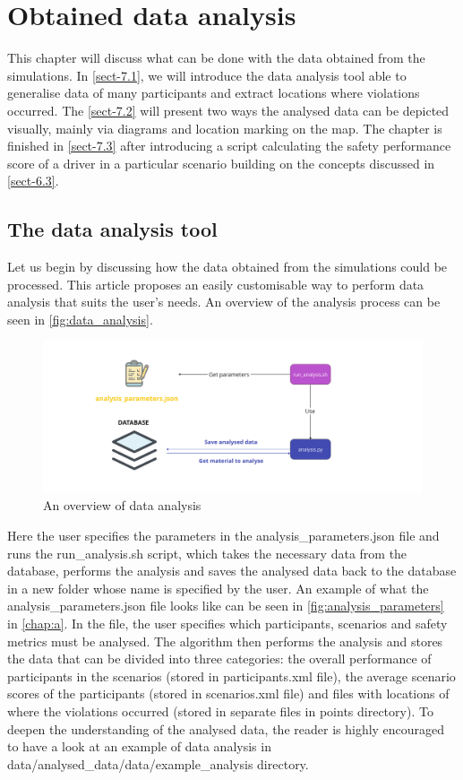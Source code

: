 \chapter{Obtained data analysis} \label{chap:seven}
This chapter will discuss what can be done with the data obtained from the simulations. In \autoref{sect-7.1}, we will introduce the data analysis tool able to generalise data of many participants and extract locations where violations occurred. The \autoref{sect-7.2} will present two ways the analysed data can be depicted visually, mainly via diagrams and location marking on the map. The chapter is finished in \autoref{sect-7.3} after introducing a script calculating the safety performance score of a driver in a particular scenario building on the concepts discussed in \autoref{sect-6.3}.

\section{The data analysis tool} \label{sect-7.1}
Let us begin by discussing how the data obtained from the simulations could be processed. This article proposes an easily customisable way to perform data analysis that suits the user's needs. An overview of the analysis process can be seen in \autoref{fig:data_analysis}.

\begin{figure} [h]
    \centering
    \includegraphics[width = \textwidth]{research_paper/Images/data_analysis.png}
    \caption{An overview of data analysis}
    \label{fig:data_analysis}
\end{figure}

Here the user specifies the parameters in the analysis\_parameters.json file and runs the run\_analysis.sh script, which takes the necessary data from the database, performs the analysis and saves the analysed data back to the database in a new folder whose name is specified by the user. An example of what the analysis\_parameters.json file looks like can be seen in \autoref{fig:analysis_parameters} in \autoref{chap:a}. In the file, the user specifies which participants, scenarios and safety metrics must be analysed. The algorithm then performs the analysis and stores the data that can be divided into three categories: the overall performance of participants in the scenarios (stored in participants.xml file), the average scenario scores of the participants (stored in scenarios.xml file) and files with locations of where the violations occurred (stored in separate files in points directory). To deepen the understanding of the analysed data, the reader is highly encouraged to have a look at an example of data analysis in data/analysed\_data/data/example\_analysis directory.

